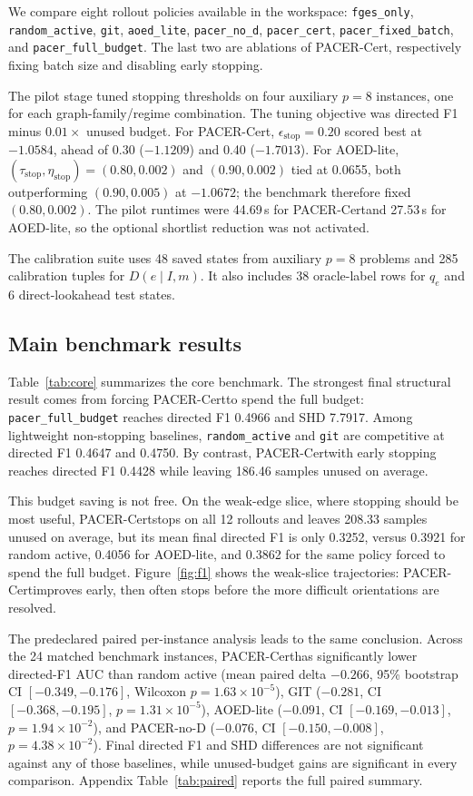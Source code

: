 \documentclass{article}
\newcommand{\method}{PACER-Cert}
\newcommand{\qe}{q_e}
\newcommand{\de}{D}
\begin{document}
We compare eight rollout policies available in the workspace:
\texttt{fges\_only},
\texttt{random\_active},
\texttt{git},
\texttt{aoed\_lite},
\texttt{pacer\_no\_d},
\texttt{pacer\_cert},
\texttt{pacer\_fixed\_batch},
and \texttt{pacer\_full\_budget}.
The last two are ablations of \method, respectively fixing batch size and disabling early stopping.

The pilot stage tuned stopping thresholds on four auxiliary $p=8$ instances, one for each graph-family/regime combination. The tuning objective was directed F1 minus $0.01\times$ unused budget. For \method, $\epsilon_{\mathrm{stop}}=0.20$ scored best at $-1.0584$, ahead of 0.30 ($-1.1209$) and 0.40 ($-1.7013$). For AOED-lite, $(\tau_{\mathrm{stop}},\eta_{\mathrm{stop}})=(0.80,0.002)$ and $(0.90,0.002)$ tied at 0.0655, both outperforming $(0.90,0.005)$ at $-1.0672$; the benchmark therefore fixed $(0.80,0.002)$. The pilot runtimes were 44.69\,s for \method and 27.53\,s for AOED-lite, so the optional shortlist reduction was not activated.

The calibration suite uses 48 saved states from auxiliary $p=8$ problems and 285 calibration tuples for $\de(e\mid I,m)$. It also includes 38 oracle-label rows for $\qe$ and 6 direct-lookahead test states.

\subsection{Main benchmark results}

Table~\ref{tab:core} summarizes the core benchmark. The strongest final structural result comes from forcing \method to spend the full budget: \texttt{pacer\_full\_budget} reaches directed F1 0.4966 and SHD 7.7917. Among lightweight non-stopping baselines, \texttt{random\_active} and \texttt{git} are competitive at directed F1 0.4647 and 0.4750. By contrast, \method with early stopping reaches directed F1 0.4428 while leaving 186.46 samples unused on average.

This budget saving is not free. On the weak-edge slice, where stopping should be most useful, \method stops on all 12 rollouts and leaves 208.33 samples unused on average, but its mean final directed F1 is only 0.3252, versus 0.3921 for random active, 0.4056 for AOED-lite, and 0.3862 for the same policy forced to spend the full budget. Figure~\ref{fig:f1} shows the weak-slice trajectories: \method improves early, then often stops before the more difficult orientations are resolved.

The predeclared paired per-instance analysis leads to the same conclusion. Across the 24 matched benchmark instances, \method has significantly lower directed-F1 AUC than random active (mean paired delta $-0.266$, 95\% bootstrap CI $[-0.349,-0.176]$, Wilcoxon $p=1.63\times10^{-5}$), GIT ($-0.281$, CI $[-0.368,-0.195]$, $p=1.31\times10^{-5}$), AOED-lite ($-0.091$, CI $[-0.169,-0.013]$, $p=1.94\times10^{-2}$), and PACER-no-D ($-0.076$, CI $[-0.150,-0.008]$, $p=4.38\times10^{-2}$). Final directed F1 and SHD differences are not significant against any of those baselines, while unused-budget gains are significant in every comparison. Appendix Table~\ref{tab:paired} reports the full paired summary.
\end{document}
